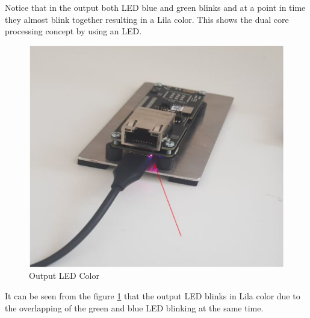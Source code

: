Notice that in the output both LED blue and green blinks and at a point in time they almost blink together resulting in a Lila color. This shows the dual core processing concept by using an LED. \\

\begin{figure}
	\begin{center}
		\includegraphics[width=0.7\linewidth]{Images/ArduinoIDE/Output.png}
		\caption{Output LED Color}
		\label{Output}
	\end{center}
\end{figure}

It can be seen from the figure \ref{Output} that the output LED blinks in Lila color due to the overlapping of the green and blue LED blinking at the same time.